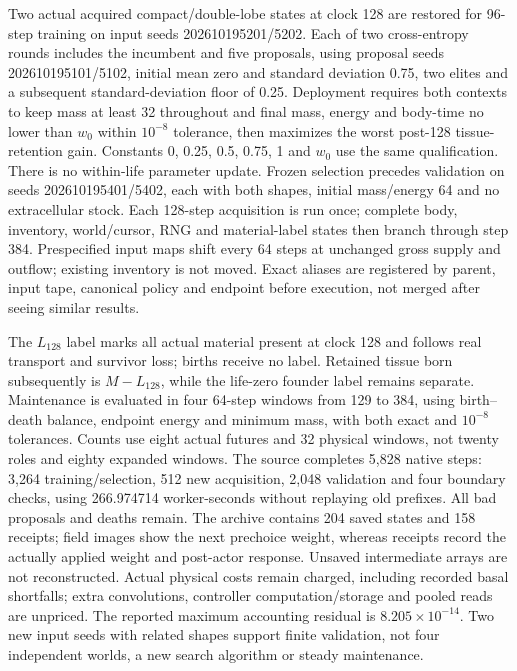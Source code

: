 Two actual acquired compact/double-lobe states at clock 128 are restored for 96-step training on input seeds 202610195201/5202. Each of two cross-entropy rounds includes the incumbent and five proposals, using proposal seeds 202610195101/5102, initial mean zero and standard deviation 0.75, two elites and a subsequent standard-deviation floor of 0.25. Deployment requires both contexts to keep mass at least 32 throughout and final mass, energy and body-time no lower than $w_0$ within $10^{-8}$ tolerance, then maximizes the worst post-128 tissue-retention gain. Constants 0, 0.25, 0.5, 0.75, 1 and $w_0$ use the same qualification. There is no within-life parameter update. Frozen selection precedes validation on seeds 202610195401/5402, each with both shapes, initial mass/energy 64 and no extracellular stock. Each 128-step acquisition is run once; complete body, inventory, world/cursor, RNG and material-label states then branch through step 384. Prespecified input maps shift every 64 steps at unchanged gross supply and outflow; existing inventory is not moved. Exact aliases are registered by parent, input tape, canonical policy and endpoint before execution, not merged after seeing similar results.

The $L_{128}$ label marks all actual material present at clock 128 and follows real transport and survivor loss; births receive no label. Retained tissue born subsequently is $M-L_{128}$, while the life-zero founder label remains separate. Maintenance is evaluated in four 64-step windows from 129 to 384, using birth--death balance, endpoint energy and minimum mass, with both exact and $10^{-8}$ tolerances. Counts use eight actual futures and 32 physical windows, not twenty roles and eighty expanded windows. The source completes 5,828 native steps: 3,264 training/selection, 512 new acquisition, 2,048 validation and four boundary checks, using 266.974714 worker-seconds without replaying old prefixes. All bad proposals and deaths remain. The archive contains 204 saved states and 158 receipts; field images show the next prechoice weight, whereas receipts record the actually applied weight and post-actor response. Unsaved intermediate arrays are not reconstructed. Actual physical costs remain charged, including recorded basal shortfalls; extra convolutions, controller computation/storage and pooled reads are unpriced. The reported maximum accounting residual is $8.205\times10^{-14}$. Two new input seeds with related shapes support finite validation, not four independent worlds, a new search algorithm or steady maintenance.

